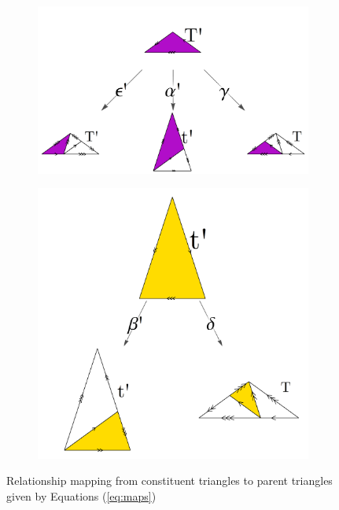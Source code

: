 \documentclass[
  oneside,
  11pt, a4paper,
  footinclude=true,
  headinclude=true,
  cleardoublepage=empty
]{scrbook}
\begin{document}
\begin{figure}[H]
        \begin{subfigure}[t]{0.6\textwidth}
                \includegraphics[width=\textwidth]{TLgraph}
        \end{subfigure}\hfill
        \begin{subfigure}[t]{0.4\textwidth}
                \includegraphics[width=\textwidth]{tslgraph}
        \end{subfigure}  
        \caption[Composition Mappings]{Relationship mapping from constituent triangles to parent triangles given by Equations (\ref{eq:maps})} 
        \label{fig:functionmap}                    
\end{figure}
\end{document}
